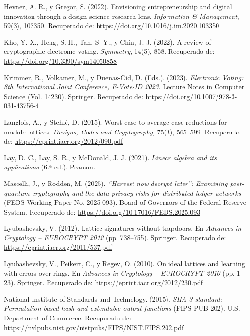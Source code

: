 \begin{flushleft}
	\hangindent=1.25cm
	Hevner, A. R., y Gregor, S. (2022). Envisioning entrepreneurship and digital innovation through a design science research lens. \textit{Information \& Management}, 59(3), 103350. Recuperado de: \url{https://doi.org/10.1016/j.im.2020.103350}

	\hangindent=1.25cm
	Kho, Y. X., Heng, S. H., Tan, S. Y., y Chin, J. J. (2022). A review of cryptographic electronic voting. \textit{Symmetry}, 14(5), 858. Recuperado de: \url{https://doi.org/10.3390/sym14050858}

	\hangindent=1.25cm
	Krimmer, R., Volkamer, M., y Duenas-Cid, D. (Eds.). (2023). \textit{Electronic Voting: 8th International Joint Conference, E-Vote-ID 2023}. Lecture Notes in Computer Science (Vol. 14230). Springer. Recuperado de: \url{https://doi.org/10.1007/978-3-031-43756-4}

	\hangindent=1.25cm
	Langlois, A., y Stehlé, D. (2015). Worst-case to average-case reductions for module lattices. \textit{Designs, Codes and Cryptography}, 75(3), 565--599. Recuperado de: \url{https://eprint.iacr.org/2012/090.pdf}

	\hangindent=1.25cm
	Lay, D. C., Lay, S. R., y McDonald, J. J. (2021). \textit{Linear algebra and its applications} (6.ª ed.). Pearson.

	\hangindent=1.25cm
	Mascelli, J., y Rodden, M. (2025). \textit{“Harvest now decrypt later”: Examining post-quantum cryptography and the data privacy risks for distributed ledger networks} (FEDS Working Paper No. 2025-093). Board of Governors of the Federal Reserve System. Recuperado de: \url{https://doi.org/10.17016/FEDS.2025.093}

	\hangindent=1.25cm
	Lyubashevsky, V. (2012). Lattice signatures without trapdoors. En \textit{Advances in Cryptology -- EUROCRYPT 2012} (pp. 738--755). Springer. Recuperado de: \url{https://eprint.iacr.org/2011/537.pdf}

	\hangindent=1.25cm
	Lyubashevsky, V., Peikert, C., y Regev, O. (2010). On ideal lattices and learning with errors over rings. En \textit{Advances in Cryptology -- EUROCRYPT 2010} (pp. 1--23). Springer. Recuperado de: \url{https://eprint.iacr.org/2012/230.pdf}

	\hangindent=1.25cm
	National Institute of Standards and Technology. (2015). \textit{SHA-3 standard: Permutation-based hash and extendable-output functions} (FIPS PUB 202). U.S. Department of Commerce. Recuperado de: \url{https://nvlpubs.nist.gov/nistpubs/FIPS/NIST.FIPS.202.pdf}


\end{flushleft}

